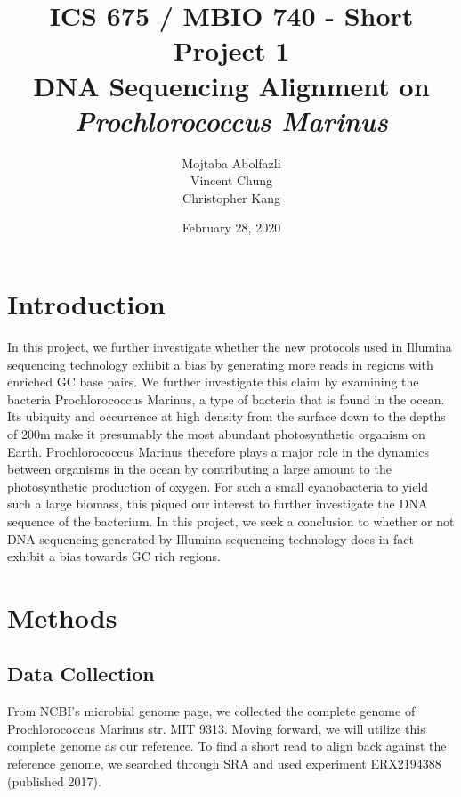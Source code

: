 \documentclass[12pt]{article}
\begin{document}
\title{ICS 675 / MBIO 740 - Short Project 1\\
DNA Sequencing Alignment on \textit{Prochlorococcus Marinus}}
\author{Mojtaba Abolfazli\\ Vincent Chung \\ Christopher Kang}
\date{February 28, 2020}
\maketitle

\newpage
\linespread{1.1}
\pagestyle{fancy}

\tableofcontents
\listoffigures

\newpage

\section{Introduction}
In this project, we further investigate whether the new protocols used in Illumina sequencing technology exhibit a bias by generating more reads in regions with enriched GC base pairs. We further investigate this claim by examining the bacteria Prochlorococcus Marinus, a type of bacteria that is found in the ocean. Its ubiquity and occurrence at high density from the surface down to the depths of 200m make it presumably the most abundant photosynthetic organism on Earth. Prochlorococcus Marinus therefore  plays a major role in the dynamics between organisms in the ocean by contributing a large amount to the photosynthetic production of oxygen. For such a small cyanobacteria to yield such a large biomass, this piqued our interest to further investigate the DNA sequence of the bacterium. In this project, we seek a conclusion to whether or not DNA sequencing generated by Illumina sequencing technology does in fact exhibit a bias towards GC rich regions.

\section{Methods}
\subsection{Data Collection}
From NCBI’s microbial genome page, we collected the complete genome of Prochlorococcus Marinus str. MIT 9313. Moving forward, we will utilize this complete genome as our reference. To find a short read to align back against the reference genome, we searched through SRA and used experiment ERX2194388 (published 2017). 
\end{document}
